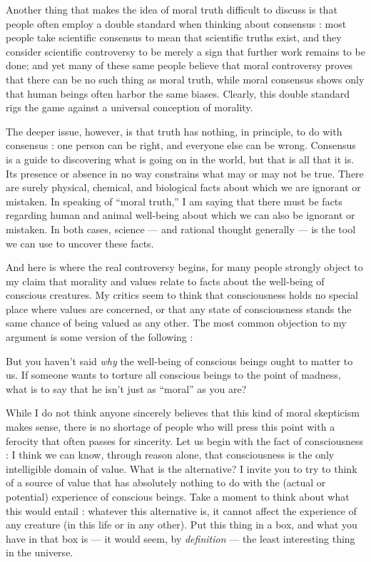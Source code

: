 \documentclass[a4paper,14pt]{extbook}
\begin{document}
Another thing that makes the idea of moral truth difficult to discuss is that people often employ a double standard when thinking about consensus :
most people take scientific consensus to mean that scientific truths exist, and they consider scientific controversy to be merely a sign that further work remains to be done;
and yet many of these same people believe that moral controversy proves that there can be no such thing as moral truth, while moral consensus shows only that human beings often harbor the same biases.
Clearly, this double standard rigs the game against a universal conception of morality.

The deeper issue, however, is that truth has nothing, in principle, to do with consensus :
one person can be right, and everyone else can be wrong.
Consensus is a guide to discovering what is going on in the world, but that is all that it is.
Its presence or absence in no way constrains what may or may not be true.
There are surely physical, chemical, and biological facts about which we are ignorant or mistaken.
In speaking of ``moral truth,'' I am saying that there must be facts regarding human and animal well-being about which we can also be ignorant or mistaken.
In both cases, science --- and rational thought generally --- is the tool we can use to uncover these facts.

And here is where the real controversy begins, for many people strongly object to my claim that morality and values relate to facts about the well-being of conscious creatures.
My critics seem to think that consciousness holds no special place where values are concerned, or that any state of consciousness stands the same chance of being valued as any other.
The most common objection to my argument is some version of the following :

But you haven't said \textit{why} the well-being of conscious beings ought to matter to us.
If someone wants to torture all conscious beings to the point of madness, what is to say that he isn't just as ``moral'' as you are?

While I do not think anyone sincerely believes that this kind of moral skepticism makes sense, there is no shortage of people who will press this point with a ferocity that often passes for sincerity.
Let us begin with the fact of consciousness :
I think we can know, through reason alone, that consciousness is the only intelligible domain of value.
What is the alternative?
I invite you to try to think of a source of value that has absolutely nothing to do with the (actual or potential) experience of conscious beings.
Take a moment to think about what this would entail :
whatever this alternative is, it cannot affect the experience of any creature (in this life or in any other).
Put this thing in a box, and what you have in that box is --- it would seem, by \textit{definition} --- the least interesting thing in the universe.
\end{document}
